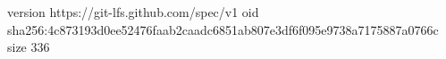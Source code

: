 version https://git-lfs.github.com/spec/v1
oid sha256:4c873193d0ee52476faab2caadc6851ab807e3df6f095e9738a7175887a0766c
size 336
